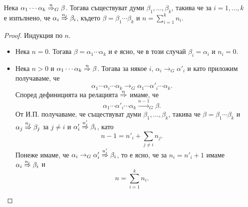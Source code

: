 \begin{framed}
  \begin{proposition}
    \label{pr:grammar:divide}
    Нека $\alpha_1\cdots \alpha_k \stackrel{{n}}{\Rightarrow}_G \beta$.
    Тогава съществуват думи $\beta_1,\dots,\beta_k$, такива че за $i = 1,\dots, k$ е изпълнено, че
    $\alpha_i \stackrel{{n_i}}{\Rightarrow} \beta_i$, където $\beta = \beta_1\cdots \beta_k$ и $n = \sum^k_{i = 1}n_i$.
  \end{proposition}
\end{framed}
\begin{proof}
  Индукция по $n$.
  \begin{itemize}
  \item
    Нека $n = 0$. Тогава $\beta = \alpha_1 \cdots \alpha_k$ и е ясно, че в този случай $\beta_i = \alpha_i$ и $n_i = 0$.
  \item
    Нека $n > 0$ и $\alpha_1\cdots \alpha_k \stackrel{{n}}{\Rightarrow} \beta$. Тогава за някое $i$, $\alpha_i \to_G \alpha'_i$ и
    като приложим  получаваме, че
    \[\alpha_1\cdots\alpha_i\cdots\alpha_k \to_G \alpha_1\cdots\alpha'_i\cdots\alpha_k.\]
    Според дефиницията на релацията $\stackrel{{n}}{\Rightarrow}$ имаме, че
    \[\alpha_1\cdots\alpha'_i\cdots\alpha_k \stackrel{n-1}{\to}_G \beta.\]
    От И.П. получаваме, че съществуват думи $\beta_1,\dots,\beta_k$, такива че $\beta = \beta_1 \cdots \beta_k$
    и $\alpha_j \stackrel{{n_j}}{\Rightarrow} \beta_j$ за $j \neq i$ и $\alpha'_i \stackrel{{n'_i}}{\Rightarrow} \beta_i$, като
    \[n-1 = n'_i + \sum_{j\neq i} n_j.\]
    Понеже имаме, че $\alpha_i \to_G \alpha'_i \stackrel{{n'_i}}{\Rightarrow}\beta_i$,
    то е ясно, че за $n_i = n'_i + 1$ имаме $\alpha_i \stackrel{{n_i}}{\Rightarrow} \beta_i$ и
    \[n = \sum^{k}_{i=1} n_i.\]
  \end{itemize}
\end{proof}





